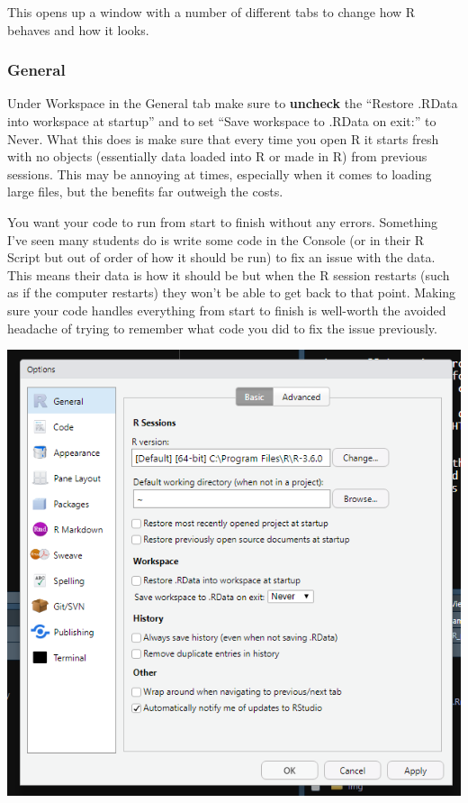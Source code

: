 \documentclass[
  12pt,
]{book}
\begin{document}
This opens up a window with a number of different tabs to change how R behaves and how it looks.

\hypertarget{general}{%
\subsubsection{General}\label{general}}

Under Workspace in the General tab make sure to \textbf{uncheck} the ``Restore .RData into workspace at startup'' and to set ``Save workspace to .RData on exit:'' to Never. What this does is make sure that every time you open R it starts fresh with no objects (essentially data loaded into R or made in R) from previous sessions. This may be annoying at times, especially when it comes to loading large files, but the benefits far outweigh the costs.

You want your code to run from start to finish without any errors. Something I've seen many students do is write some code in the Console (or in their R Script but out of order of how it should be run) to fix an issue with the data. This means their data is how it should be but when the R session restarts (such as if the computer restarts) they won't be able to get back to that point. Making sure your code handles everything from start to finish is well-worth the avoided headache of trying to remember what code you did to fix the issue previously.

\includegraphics{images/rstudio_6.PNG}
\end{document}
